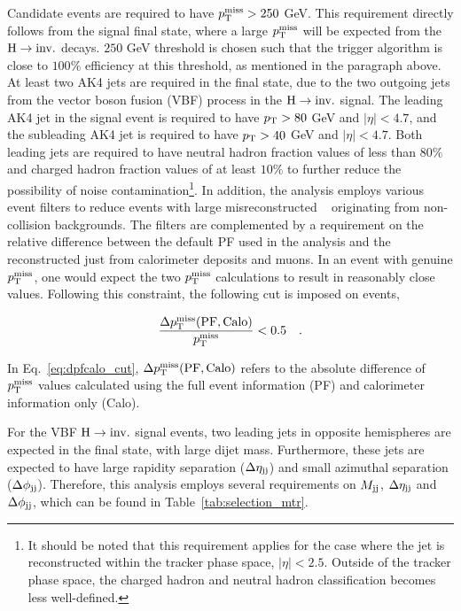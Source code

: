 Candidate events are required to have $p_{\textrm{T}}^{\textrm{miss}} > 250$ GeV. This requirement directly follows from the signal final state,
where a large $p_{\textrm{T}}^{\textrm{miss}}$ will be expected from the $\textrm{H} \rightarrow \textrm{inv.}$ decays. $250$ GeV threshold is chosen such that the trigger
algorithm is close to $100\%$ efficiency at this threshold, as mentioned in the paragraph above.
At least two AK4 jets are required in the final state, due to the two outgoing jets from the vector boson fusion (VBF) process
in the $\textrm{H} \rightarrow \textrm{inv.}$ signal.
The leading AK4 jet in the signal event is required to have $p_{\textrm{T}} > 80$ GeV and $|\eta| < 4.7$, and the subleading AK4 jet is 
required to have $p_{\textrm{T}} > 40$ GeV and $|\eta| < 4.7$.
Both leading jets are required to have neutral hadron fraction values of less than $80\%$ and charged hadron fraction 
values of at least $10\%$ to further reduce the possibility of noise contamination\footnote{It should be noted that
this requirement applies for the case where the jet is reconstructed within the tracker phase space, $|\eta| < 2.5$.
Outside of the tracker phase space, the charged hadron and neutral hadron classification becomes less well-defined.}. 
In addition, the analysis employs 
various event filters to reduce events with large misreconstructed \ptmiss~\cite{Sirunyan:2019kia} originating from 
non-collision backgrounds. The filters are complemented by a requirement on the relative difference between the default 
PF \ptmiss used in the analysis and the \ptmiss reconstructed just from calorimeter deposits and muons. 
In an event with genuine $p_{\textrm{T}}^{\textrm{miss}}$, one would expect the two $p_{\textrm{T}}^{\textrm{miss}}$ calculations to result in reasonably close values.
Following this constraint, the following cut is imposed on events,

\begin{equation}
    \frac{\Delta p_{\textrm{T}}^{\textrm{miss}}(\text{PF},\text{Calo})}{p_{\textrm{T}}^{\textrm{miss}}} < 0.5 \quad .
    \label{eq:dpfcalo_cut}
\end{equation}

In Eq.~\ref{eq:dpfcalo_cut}, $\Delta p_{\textrm{T}}^{\textrm{miss}}(\text{PF},\text{Calo})$ refers to the absolute difference of $p_{\textrm{T}}^{\textrm{miss}}$ values calculated
using the full event information (PF) and calorimeter information only (Calo).

For the VBF $\textrm{H} \rightarrow \textrm{inv.}$ signal events, two leading jets in opposite hemispheres are expected in the final state, with large dijet mass. 
Furthermore, these jets are expected to have large rapidity separation ($\Delta \eta_{\textrm{jj}}$) and small azimuthal separation ($\Delta \phi_{\textrm{jj}}$). 
Therefore, this analysis employs several requirements on $M_{\textrm{jj}}$, $\Delta \eta_{\textrm{jj}}$ and $\Delta \phi_{\textrm{jj}}$, which can be 
found in Table~\ref{tab:selection_mtr}.

